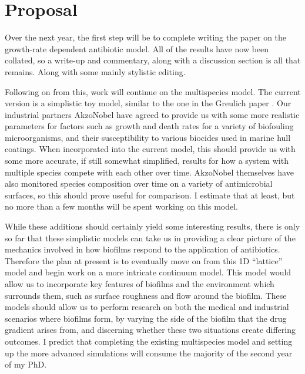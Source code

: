 \documentclass[a4paper,12pt]{article}
\begin{document}
\section{Proposal}

Over the next year, the first step will be to complete writing the paper on the growth-rate dependent antibiotic model.  All of
the results have now been collated, so a write-up and commentary, along with a discussion section is all that remains.  Along with some mainly stylistic editing.

Following on from this, work will continue on the multispecies model.  The current version is a simplistic toy model, similar to the one in the 
Greulich paper \cite{bioref:Greulich-growthDependentAntibiotics}.  Our industrial partners AkzoNobel have agreed to provide us with some more realistic parameters for factors such as 
growth and death rates for a variety of biofouling microorganisms, and their susceptibility to various biocides used in marine hull coatings.  When incorporated into the current model, 
this should provide us with some more accurate, if still somewhat simplified, results for how a system with multiple species compete with each other over time.  AkzoNobel themselves 
have also monitored species composition over time on a variety of antimicrobial surfaces, so this should prove useful for comparison.  I estimate 
that at least, but no more than a few months will be spent working on this model.

While these additions should certainly yield some interesting results, there is only so far that these simplistic models can take us in providing a clear picture of the mechanics 
involved in how biofilms respond to the application of antibiotics.  Therefore the plan at present is to eventually move on from this 1D ``lattice'' model and begin work on a more 
intricate continuum model.  This model would allow us to incorporate key features of biofilms and the environment which surrounds them, such as surface roughness and flow around 
the biofilm.  These models should allow us to perform research on both the medical and industrial scenarios where biofilms form, by varying the side of the biofilm that the 
drug gradient arises from, and discerning whether these two situations create differing outcomes.  I predict that completing the existing multispecies model and setting up the more 
advanced simulations will consume the majority of the second year of my PhD.
\end{document}
